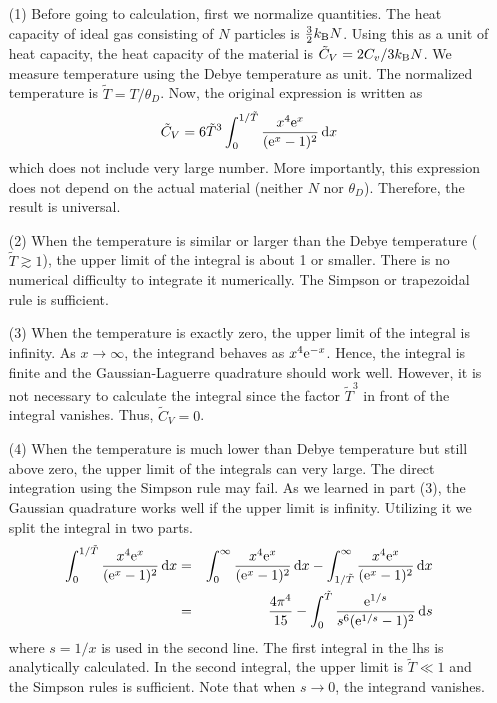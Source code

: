 \begin{itemize}
\item[(1)]  Before going to calculation, first we normalize quantities. The heat capacity of ideal gas consisting of $N$ particles is
$\frac{3}{2} k_\text{B} N$.  Using this as a unit of heat capacity, the heat capacity of the material is $\tilde{C}_V = 2 C_v/3 k_\text{B} N$.  We measure temperature using the Debye temperature as unit. The normalized temperature is $\tilde{T} = T/\theta_D$.  Now, the original expression is written as
\begin{equation}\label{eq:debye_normalized}
\tilde{C}_V = 6 \tilde{T}^3 \int_0^{1/\tilde{T}}   \frac{x^4 \text{e}^x}{(\text{e}^x-1)^2} \dd{x}
\end{equation}
which does not include very large number. More importantly, this expression does not depend on the actual material (neither $N$ nor $\theta_D$).  Therefore, the result is universal.
\item[(2)] When the temperature is similar or larger than the Debye temperature ($\tilde{T} \gtrsim 1$), the upper limit of the integral is about 1 or smaller.  There is no numerical difficulty to integrate it numerically.  The Simpson or trapezoidal rule is sufficient.
\item[(3)] When the temperature is exactly zero, the upper limit of the integral is infinity.  As $x \rightarrow \infty$, the integrand behaves as $x^4 \text{e}^{-x}$.  Hence, the integral is finite and the Gaussian-Laguerre quadrature should work well.  However, it is not necessary to calculate the integral since the factor $\tilde{T}^3$ in front of the integral vanishes.  Thus, $\tilde{C}_V=0$.
\item[(4)] When the temperature is much lower than Debye temperature but still above zero, the upper limit of the integrals can very large. The direct integration using the Simpson rule may fail.  As we learned in part (3), the Gaussian quadrature works well if the upper limit is infinity.  Utilizing it we split the integral in two parts.
%
\begin{eqnarray}
\int_0^{1/\tilde{T}}  \frac{x^4 \text{e}^x}{(\text{e}^x-1)^2} \dd{x} &=& \int_0^\infty  \frac{x^4 \text{e}^x}{(\text{e}^x-1)^2} \dd{x} - 
\int_{1/\tilde{T}}^\infty  \frac{x^4 \text{e}^x}{(\text{e}^x-1)^2} \dd{x} \\
&=&  \frac{4 \pi^4}{15} - \int_{0}^{\tilde{T}} \frac{\text{e}^{1/s}}{s^6 (\text{e}^{1/s} - 1)^2} \dd{s}
\end{eqnarray}
%
where $s=1/x$ is used in the second line.  The first integral in the lhs is analytically calculated. In the second integral, the upper limit is  $\tilde{T} \ll 1$ and the Simpson rules is sufficient.  Note that when $s \rightarrow 0$, the integrand vanishes. 
\end{itemize}

